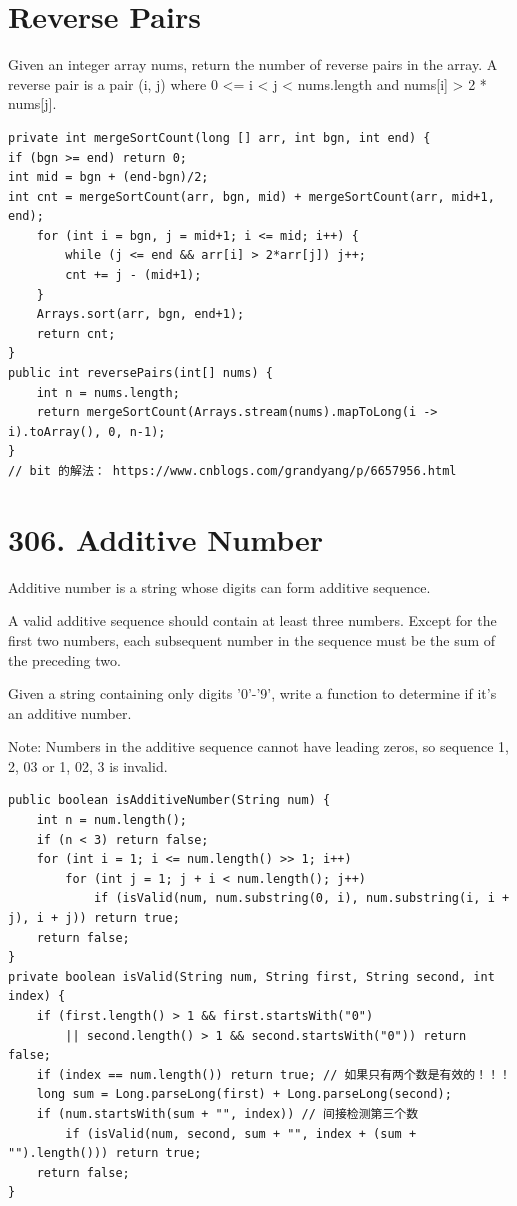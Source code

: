 \documentclass[9pt, b5paaper]{book}
\begin{document}
\section{Reverse Pairs}
\label{sec-3-3}
Given an integer array nums, return the number of reverse pairs in the array.
A reverse pair is a pair (i, j) where 0 <= i < j < nums.length and nums[i] > 2 * nums[j].
\begin{verbatim}
private int mergeSortCount(long [] arr, int bgn, int end) {
if (bgn >= end) return 0;
int mid = bgn + (end-bgn)/2;
int cnt = mergeSortCount(arr, bgn, mid) + mergeSortCount(arr, mid+1, end);
    for (int i = bgn, j = mid+1; i <= mid; i++) {
        while (j <= end && arr[i] > 2*arr[j]) j++;
        cnt += j - (mid+1);
    }
    Arrays.sort(arr, bgn, end+1);
    return cnt;
}
public int reversePairs(int[] nums) {
    int n = nums.length;
    return mergeSortCount(Arrays.stream(nums).mapToLong(i -> i).toArray(), 0, n-1);
}
// bit 的解法： https://www.cnblogs.com/grandyang/p/6657956.html
\end{verbatim}

\section{306. Additive Number}
\label{sec-3-4}
Additive number is a string whose digits can form additive sequence.

A valid additive sequence should contain at least three numbers. Except for the first two numbers, each subsequent number in the sequence must be the sum of the preceding two.

Given a string containing only digits '0'-'9', write a function to determine if it's an additive number.

Note: Numbers in the additive sequence cannot have leading zeros, so sequence 1, 2, 03 or 1, 02, 3 is invalid.
\begin{verbatim}
public boolean isAdditiveNumber(String num) {
    int n = num.length();
    if (n < 3) return false;
    for (int i = 1; i <= num.length() >> 1; i++)
        for (int j = 1; j + i < num.length(); j++)  
            if (isValid(num, num.substring(0, i), num.substring(i, i + j), i + j)) return true;
    return false;
}
private boolean isValid(String num, String first, String second, int index) {
    if (first.length() > 1 && first.startsWith("0") 
        || second.length() > 1 && second.startsWith("0")) return false;
    if (index == num.length()) return true; // 如果只有两个数是有效的！！！
    long sum = Long.parseLong(first) + Long.parseLong(second);
    if (num.startsWith(sum + "", index)) // 间接检测第三个数
        if (isValid(num, second, sum + "", index + (sum + "").length())) return true;
    return false;
}
\end{verbatim}
\end{document}
